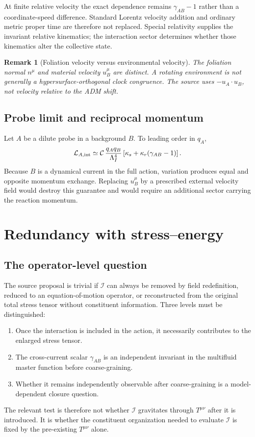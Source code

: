 \documentclass[11pt]{article}
\newtheorem{remark}[definition]{Remark}
\newcommand{\Lag}{\mathcal L}
\begin{document}
At finite relative velocity the exact dependence remains $\gamma_{AB}-1$ rather than a coordinate-speed difference.  Standard Lorentz velocity addition and ordinary metric proper time are therefore not replaced.  Special relativity supplies the invariant relative kinematics; the interaction sector determines whether those kinematics alter the collective state.

\begin{remark}[Foliation velocity versus environmental velocity]
The foliation normal $n^\mu$ and material velocity $u_B^\mu$ are distinct.  A rotating environment is not generally a hypersurface-orthogonal clock congruence.  The source uses $-u_A\cdot u_B$, not velocity relative to the ADM shift.
\end{remark}

\subsection{Probe limit and reciprocal momentum}

Let $A$ be a dilute probe in a background $B$.  To leading order in $q_A$,
\begin{equation}
\Lag_{A,\rm int}
\simeq
\mathcal C\,
\frac{q_Aq_B}{\Lambda_I^4}
\left[\kappa_s+\kappa_r(\gamma_{AB}-1)\right].
\label{eq:probeL}
\end{equation}
Because $B$ is a dynamical current in the full action, variation produces equal and opposite momentum exchange.  Replacing $u_B^\mu$ by a prescribed external velocity field would destroy this guarantee and would require an additional sector carrying the reaction momentum.

\section{Redundancy with stress--energy}

\subsection{The operator-level question}

The source proposal is trivial if $\mathcal I$ can always be removed by field redefinition, reduced to an equation-of-motion operator, or reconstructed from the original total stress tensor without constituent information.  Three levels must be distinguished:
\begin{enumerate}[label=(\alph*)]
\item Once the interaction is included in the action, it necessarily contributes to the enlarged stress tensor.
\item The cross-current scalar $\gamma_{AB}$ is an independent invariant in the multifluid master function before coarse-graining.
\item Whether it remains independently observable after coarse-graining is a model-dependent closure question.
\end{enumerate}
The relevant test is therefore not whether $\mathcal I$ gravitates through $T^{\mu\nu}$ after it is introduced.  It is whether the constituent organization needed to evaluate $\mathcal I$ is fixed by the pre-existing $T^{\mu\nu}$ alone.
\end{document}

